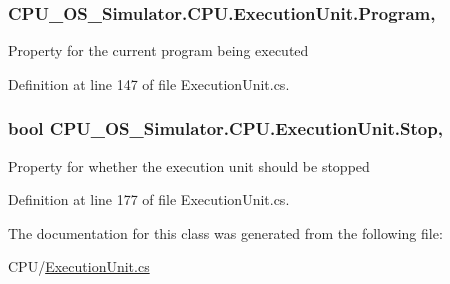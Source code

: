 \subsubsection[{Program}]{ C\+P\+U\+\_\+\+O\+S\+\_\+\+Simulator.\+C\+P\+U.\+Execution\+Unit.\+Program\hspace{0.3cm}{\ttfamily [get]}, {\ttfamily [set]}}\label{class_c_p_u___o_s___simulator_1_1_c_p_u_1_1_execution_unit_a5266ac137491de1efa6c4d707fcd162e}


Property for the current program being executed 



Definition at line 147 of file Execution\+Unit.\+cs.

\hypertarget{class_c_p_u___o_s___simulator_1_1_c_p_u_1_1_execution_unit_a1b8748f1c6679263e5dc03fe382ad150}{}
\subsubsection[{Stop}]{\setlength{\rightskip}{0pt plus 5cm}bool C\+P\+U\+\_\+\+O\+S\+\_\+\+Simulator.\+C\+P\+U.\+Execution\+Unit.\+Stop\hspace{0.3cm}{\ttfamily [get]}, {\ttfamily [set]}}\label{class_c_p_u___o_s___simulator_1_1_c_p_u_1_1_execution_unit_a1b8748f1c6679263e5dc03fe382ad150}


Property for whether the execution unit should be stopped 



Definition at line 177 of file Execution\+Unit.\+cs.



The documentation for this class was generated from the following file\+:\begin{DoxyCompactItemize}
\item 
C\+P\+U/\hyperlink{_execution_unit_8cs}{Execution\+Unit.\+cs}\end{DoxyCompactItemize}
